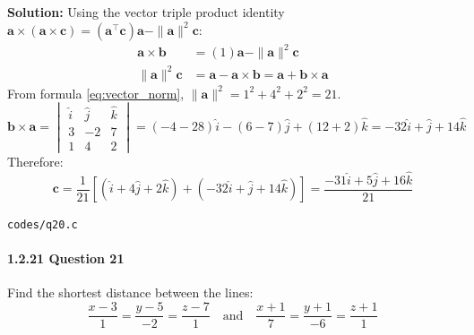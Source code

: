 \documentclass{article}
\begin{document}
\textbf{Solution:} Using the vector triple product identity $\mathbf{a} \times (\mathbf{a} \times \mathbf{c}) = (\mathbf{a}^\top \mathbf{c})\mathbf{a} - \|\mathbf{a}\|^2 \mathbf{c}$:
\begin{align}
\mathbf{a} \times \mathbf{b} &= (1)\mathbf{a} - \|\mathbf{a}\|^2 \mathbf{c} \\
\|\mathbf{a}\|^2 \mathbf{c} &= \mathbf{a} - \mathbf{a} \times \mathbf{b} = \mathbf{a} + \mathbf{b} \times \mathbf{a}
\end{align}
From formula \eqref{eq:vector_norm}, $\|\mathbf{a}\|^2 = 1^2 + 4^2 + 2^2 = 21$.
\begin{equation}
\mathbf{b} \times \mathbf{a} = \begin{vmatrix} \hat{i} & \hat{j} & \hat{k} \\ 3 & -2 & 7 \\ 1 & 4 & 2 \end{vmatrix} = (-4 - 28)\hat{i} - (6 - 7)\hat{j} + (12 + 2)\hat{k} = -32\hat{i} + \hat{j} + 14\hat{k}
\end{equation}
Therefore:
\begin{equation}
\mathbf{c} = \frac{1}{21}\left[ (\hat{i} + 4\hat{j} + 2\hat{k}) + (-32\hat{i} + \hat{j} + 14\hat{k}) \right] = \frac{-31\hat{i} + 5\hat{j} + 16\hat{k}}{21}
\end{equation}
\begin{tcolorbox}[colback=gray!10,colframe=black,width=\linewidth]
\texttt{codes/q20.c}
\end{tcolorbox}

\paragraph{1.2.21 Question 21}
Find the shortest distance between the lines:
\begin{equation}
\frac{x - 3}{1} = \frac{y - 5}{-2} = \frac{z - 7}{1} \quad \text{and} \quad \frac{x + 1}{7} = \frac{y + 1}{-6} = \frac{z + 1}{1}
\end{equation}
\end{document}
